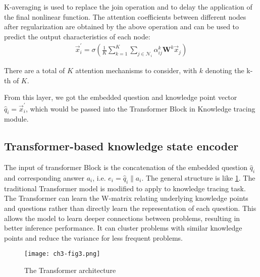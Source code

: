 K-averaging is used to replace the join operation and to delay the application of the final nonlinear function. The attention coefficients between different nodes after regularization are obtained by the above operation and can be used to predict the output characteristics of each node:
\begin{align}
	\vec{x}_{i}^{\prime}=\sigma(\frac{1}{K} \sum_{k=1}^{K} \sum_{j \in \mathcal{N}_{i}} \alpha_{i j}^{k} \mathbf{W}^{k} \vec{x}_{j})
\end{align}

There are a total of \(K\) attention mechanisms to consider, with \(k\) denoting the k-th of \(K\).


From this layer, we got the embedded question and knowledge point vector \(\hat{q}_{i} =  \vec{x}_{i}^{\prime}\), which would be passed into the Transformer Block in Knowledge tracing module.

\subsection{Transformer-based knowledge state encoder}
The input of transformer Block is the concatenation of the embedded question \(\hat{q}_{i}\) and corresponding answer \(a_i\), i.e. \(e_i=\hat{q}_{i}\|a_i\). The general structure is like \figurename{\ref{fig:ch3-fig5}}. The traditional Transformer model is modified to apply to knowledge tracing task. The Transformer can learn the W-matrix relating underlying knowledge points and questions rather than directly learn the representation of each question. This allows the model to learn deeper connections between problems, resulting in better inference performance. It can cluster problems with similar knowledge points and reduce the variance for less frequent problems.
\begin{figure}[htbp!]
	\centering
	\texttt{[image: ch3-fig3.png]}
	\caption{The Transformer architecture}
	\label{fig:ch3-fig5}
\end{figure}


